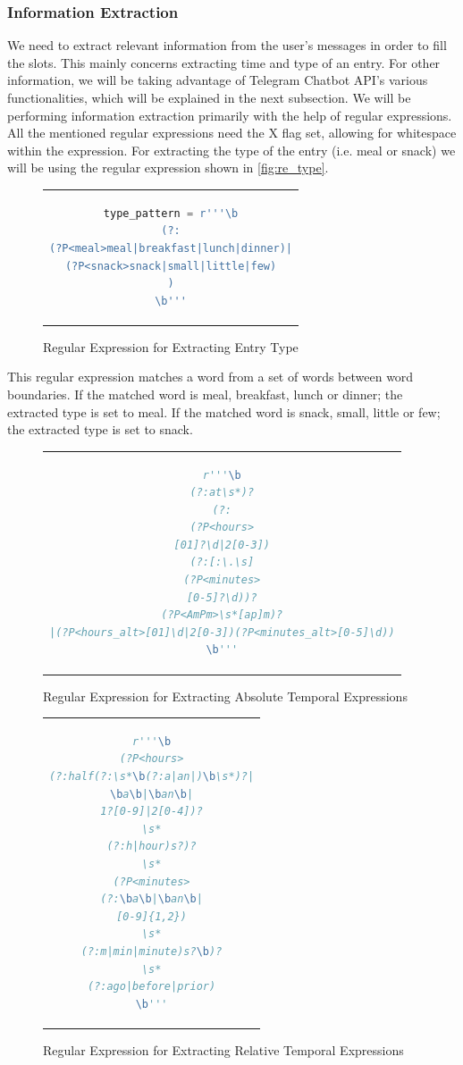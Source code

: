 \subsubsection{Information Extraction}
We need to extract relevant information from the user's messages in order to fill the slots.
This mainly concerns extracting time and type of an entry.
For other information, we will be taking advantage of Telegram Chatbot API's various functionalities, which will be explained in the next subsection.
We will be performing information extraction primarily with the help of regular expressions.
All the mentioned regular expressions need the X flag set, allowing for whitespace within the expression.
For extracting the type of the entry (i.e. meal or snack) we will be using the regular expression shown in \autoref{fig:re_type}.

\begin{figure}[htpb]
  \centering
  \begin{tabular}{c}
  \begin{lstlisting}[language=python]
type_pattern = r'''\b
(?:
(?P<meal>meal|breakfast|lunch|dinner)|
(?P<snack>snack|small|little|few)
)
\b'''
  \end{lstlisting}
  \end{tabular}
  \caption[Regular Expression for Extracting Entry Type]{Regular Expression for Extracting Entry Type}
  \label{fig:re_type}
\end{figure}

This regular expression matches a word from a set of words between word boundaries.
If the matched word is meal, breakfast, lunch or dinner; the extracted type is set to meal.
If the matched word is snack, small, little or few; the extracted type is set to snack.


\begin{figure}[htpb]
  \centering
  \begin{tabular}{c}
  \begin{lstlisting}[language=python]
r'''\b
(?:at\s*)?
(?:
(?P<hours>
[01]?\d|2[0-3])
(?:[:\.\s]
(?P<minutes>
[0-5]?\d))?
(?P<AmPm>\s*[ap]m)?
|(?P<hours_alt>[01]\d|2[0-3])(?P<minutes_alt>[0-5]\d))
\b'''
  \end{lstlisting}
  \end{tabular}
  \caption[Regular Expression for Extracting Absolute Temporal Expressions]{Regular Expression for Extracting Absolute Temporal Expressions}
  \label{fig:re_time_a}
\end{figure}

\begin{figure}[htpb]
  \centering
  \begin{tabular}{c}
  \begin{lstlisting}[language=python]
r'''\b
(?P<hours>
(?:half(?:\s*\b(?:a|an|)\b\s*)?|
\ba\b|\ban\b|
1?[0-9]|2[0-4])?
\s*
(?:h|hour)s?)?
\s*
(?P<minutes>
(?:\ba\b|\ban\b|
[0-9]{1,2})
\s*
(?:m|min|minute)s?\b)?
\s*
(?:ago|before|prior)
\b'''
  \end{lstlisting}
  \end{tabular}
  \caption[Regular Expression for Extracting Relative Temporal Expressions]{Regular Expression for Extracting Relative Temporal Expressions}
  \label{fig:re_time_r}
\end{figure}

